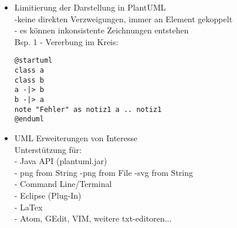 \begin{itemize}
\item Limitierung der Darstellung in PlantUML\\
-keine direkten Verzweigungen, immer an Element gekoppelt\\
- es können inkonsistente Zeichnungen entstehen\\
Bsp. 1 - Vererbung im Kreis:
\begin{lstlisting}
@startuml
class a
class b
a -|> b
b -|> a
note "Fehler" as notiz1 a .. notiz1
@enduml
\end{lstlisting}
\item UML Erweiterungen von Interesse\\
Unterstützung für: \\
- Java API (plantuml.jar)\\
- png from String -png from File -svg from String\\
- Command Line/Terminal\\
- Eclipse (Plug-In)\\
- LaTex\\
- Atom, GEdit, VIM, weitere txt-editoren...\\
\end{itemize}

\nsecend
